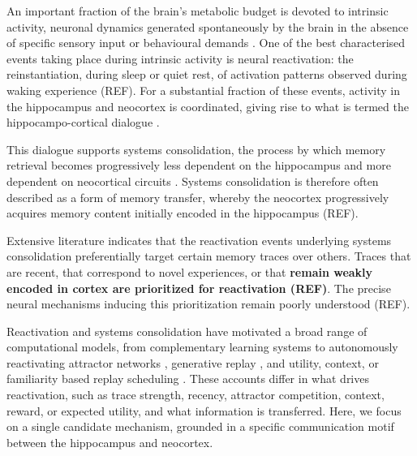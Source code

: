 \documentclass[10pt,letterpaper]{article}
\theoremstyle{plain}
\theoremstyle{remark}
\begin{document}
An important fraction of the brain's metabolic budget is devoted to intrinsic activity, neuronal dynamics generated spontaneously by the brain in the absence of specific sensory input or behavioural demands \cite{raichle2002budget,raichle2006dark}. One of the best characterised events taking place during intrinsic activity is neural reactivation: the reinstantiation, during sleep or quiet rest, of activation patterns observed during waking experience (REF). For a substantial fraction of these events, activity in the hippocampus and neocortex is coordinated, giving rise to what is termed the hippocampo-cortical dialogue \cite{klinzing2019mechanisms,staresina2023coupled}.

This dialogue supports systems consolidation, the process by which memory retrieval becomes progressively less dependent on the hippocampus and more dependent on neocortical circuits \cite{klinzing2019mechanisms, diekelmann2010memory, squire2015consolidation, kitamura2017engrams}. Systems consolidation is therefore often described as a form of memory transfer, whereby the neocortex progressively acquires memory content initially encoded in the hippocampus (REF).

Extensive literature indicates that the reactivation events underlying systems consolidation preferentially target certain memory traces over others. Traces that are recent, that correspond to novel experiences, or that \textbf{remain weakly encoded in cortex are prioritized for reactivation (REF)}. The precise neural mechanisms inducing this prioritization remain poorly understood (REF). 

Reactivation and systems consolidation have motivated a broad range of computational models, from complementary learning systems \cite{mcclelland1995complementary} to autonomously reactivating attractor networks \cite{kali2004offline,fiebig2014autonomous,singh2022autonomous}, generative replay \cite{barry2022replay,spens2024generative}, and utility, context, or familiarity based replay scheduling \cite{mattar2018prioritized,diekmann2023replay,sun2023gocls,lindsey2024recall,zhou2026context}. These accounts differ in what drives reactivation, such as trace strength, recency, attractor competition, context, reward, or expected utility, and what  information is transferred. Here, we focus on a single candidate mechanism, grounded in a specific communication motif between the hippocampus and neocortex.
\end{document}
